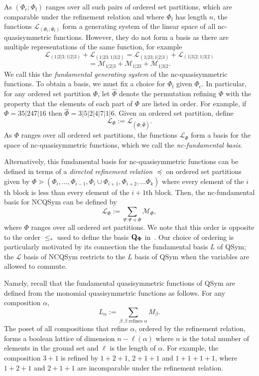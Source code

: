 \documentclass[12pt,reqno]{amsart}
\numberwithin{definition}{section}
\theoremstyle{definition}
\newcommand{\ncM}{\mathcal{M}}
\newcommand{\ncL}{\mathcal{L}}
\begin{document}
As $(\Phi_\text{c};\Phi_\text{f})$ ranges over all such pairs of ordered set partitions, which are comparable under the refinement relation and  where $\Phi_\text{f}$ has length $n$, the functions $\ncL_{(\Phi_\text{c};\Phi_\text{f})}$ form a generating system of the linear space of all nc-quasisymmetric functions. However, they do not form a basis as there are multiple representations of the same function, for example
\[
  \ncL_{(1|2|3;1|2|3)} + \ncL_{(1|23;1|3|2)} =   \ncL_{(1|23;1|2|3)} +  \ncL_{(1|3|2;1|3|2)}
\]
$$ = \ncM_{1|2|3} + \ncM_{1|23} + \ncM_{1|3|2}.$$
We call this the \emph{fundamental generating system} of the nc-quasisymmetric functions. To obtain a basis, we must fix a choice for $\Phi_\text{f}$ given $\Phi_\text{c}$.  In particular, for any ordered set partition $\Phi$, let $\hat{\Phi}$ denote the permutation refining $\Phi$ with the property that the elements of each part of $\Phi$ are listed in order. For example, if $\Phi=35|247|16$ then $\hat{\Phi}=3|5|2|4|7|1|6$. 
Given an ordered set partition, define
 $$\ncL_\Phi:=\ncL_{(\Phi;\hat{\Phi})}.$$ As $\Phi$ ranges over all ordered set partitions, the functions $\ncL_\Phi$ form a basis for the space of nc-quasisymmetric functions, which we call the \emph{nc-fundamental basis}.

Alternatively, this fundamental basis for nc-quasisymmetric functions can be defined in terms of a \emph{directed refinement relation} $\preceq$ on ordered set partitions given by $\Phi \gtrdot (\Phi_i, \ldots,\Phi_{i-1}, \Phi_i \cup \Phi_{i+1}, \Phi_{i+2}, \ldots \Phi_k)$ where every element of the $i$th block is less than every element of the $i+1$th block.  Then, the nc-fundamental basis for NCQSym can be defined by
$$\mathcal{L}_{\Phi} := \sum_{\Psi:\Psi \preceq \Phi} \ncM_{\Phi},$$
where $\Phi$ ranges over all ordered set partitions. 
We note that this order is opposite to the order $\leq_*$ used to define the basis ${\bf Q_{\Phi}}$ in~\cite{Zab}. 
Our choice of ordering is particularly motivated by its connection the the fundamental basis $L$ of QSym; the $\ncL$ basis of NCQSym restricts to the $L$ basis of QSym when the variables are allowed to commute.  

Namely, recall that 
the fundamental quasisymmetric functions of QSym are defined from the monomial quasisymmetric functions as follows.  For any composition $\alpha$, 
$$L_{\alpha} := \sum_{\beta:\beta \textrm{ refines } \alpha} M_{\beta}.$$
The poset of all compositions that refine $\alpha$, ordered by the refinement relation, forms a boolean lattice of dimension $n-\ell(\alpha)$ where $n$ is the total number of elements in the ground set and $\ell$ is the length of $\alpha$. For example, the composition $3+1$ is refined by $1+2+1$, $2+1+1$ and $1+1+1+1$, where $1+2+1$ and $2+1+1$ are incomparable under the refinement relation.
\end{document}
